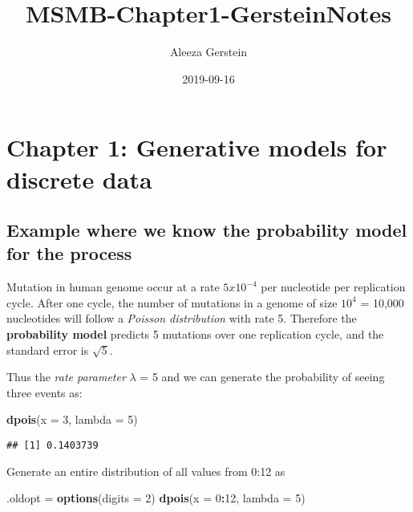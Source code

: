 \documentclass[]{article}
\title{MSMB-Chapter1-GersteinNotes}
\author{Aleeza Gerstein}
\date{2019-09-16}
\newenvironment{Shaded}{\begin{snugshade}}{\end{snugshade}}
\newcommand{\KeywordTok}[1]{\textcolor[rgb]{0.13,0.29,0.53}{\textbf{#1}}}
\newcommand{\DataTypeTok}[1]{\textcolor[rgb]{0.13,0.29,0.53}{#1}}
\newcommand{\DecValTok}[1]{\textcolor[rgb]{0.00,0.00,0.81}{#1}}
\newcommand{\StringTok}[1]{\textcolor[rgb]{0.31,0.60,0.02}{#1}}
\newcommand{\OperatorTok}[1]{\textcolor[rgb]{0.81,0.36,0.00}{\textbf{#1}}}
\newcommand{\NormalTok}[1]{#1}
\begin{document}
\maketitle

\section{Chapter 1: Generative models for discrete
data}\label{chapter-1-generative-models-for-discrete-data}

\subsection{Example where we know the probability model for the
process}\label{example-where-we-know-the-probability-model-for-the-process}

Mutation in human genome occur at a rate \(5x10^{-4}\) per nucleotide
per replication cycle. After one cycle, the number of mutations in a
genome of size \(10^4\) = 10,000 nucleotides will follow a \emph{Poisson
distribution} with rate 5. Therefore the \textbf{probability model}
predicts 5 mutations over one replication cycle, and the standard error
is \(\sqrt{5}\).

Thus the \emph{rate parameter} \(\lambda\) = 5 and we can generate the
probability of seeing three events as:

\begin{Shaded}
\begin{Highlighting}[]
\KeywordTok{dpois}\NormalTok{(}\DataTypeTok{x =} \DecValTok{3}\NormalTok{, }\DataTypeTok{lambda =} \DecValTok{5}\NormalTok{)}
\end{Highlighting}
\end{Shaded}

\begin{verbatim}
## [1] 0.1403739
\end{verbatim}

Generate an entire distribution of all values from 0:12 as

\begin{Shaded}
\begin{Highlighting}[]
\NormalTok{.oldopt =}\StringTok{ }\KeywordTok{options}\NormalTok{(}\DataTypeTok{digits =} \DecValTok{2}\NormalTok{)}
\KeywordTok{dpois}\NormalTok{(}\DataTypeTok{x =} \DecValTok{0}\OperatorTok{:}\DecValTok{12}\NormalTok{, }\DataTypeTok{lambda =} \DecValTok{5}\NormalTok{)}
\end{Highlighting}
\end{Shaded}
\end{document}
